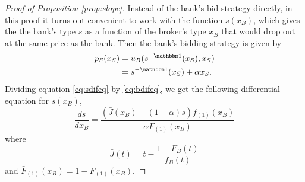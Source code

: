 \documentclass[11pt,twopage]{article}
\begin{document}
\begin{proof}[Proof of Proposition \ref{prop:slope}]
  Instead of the bank's bid strategy directly, in this proof it turns
  out convenient to work with the function $s(x_B)$, which gives the
  the bank's type $s$ as a function of the broker's type $x_B$ that
  would drop out at the same price as the bank. Then the bank's
  bidding strategy is given by
  \begin{align}
    p_S(x_S) &= u_B(s^{-\mathbbm 1}(x_S),x_S) \\&= s^{-\mathbbm
      1}(x_S)+\alpha x_S .
  \end{align}
  Dividing equation \eqref{eq:sdifeq} by \eqref{eq:bdifeq}, we get the
  following differential equation for $s(x_B)$,
  \[
  \frac{ds}{dx_B} = \frac{(\bar J(x_B) - (1-\alpha)
    s)f_{(1)}(x_B)}{\alpha \bar F_{(1)}(x_B)}
  \]
  where \[ \bar J(t) = t-\frac{1-F_B(t)}{f_B(t)} \] and $\bar
  F_{(1)}(x_B) = 1- F_{(1)}(x_B)$.


\end{proof}
\end{document}
